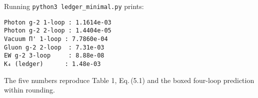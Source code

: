 \documentclass[11pt]{article}
\begin{document}
Running \verb|python3 ledger_minimal.py| prints:

\begin{verbatim}
Photon g-2 1-loop : 1.1614e-03
Photon g-2 2-loop : 1.4404e-05
Vacuum Π' 1-loop : 7.7860e-04
Gluon g-2 2-loop  : 7.31e-03
EW g-2 3-loop     : 8.88e-08
K₄ (ledger)      : 1.48e-03
\end{verbatim}

\noindent
The five numbers reproduce Table 1, Eq.\,(5.1) and the
boxed four-loop prediction within rounding.
\end{document}
